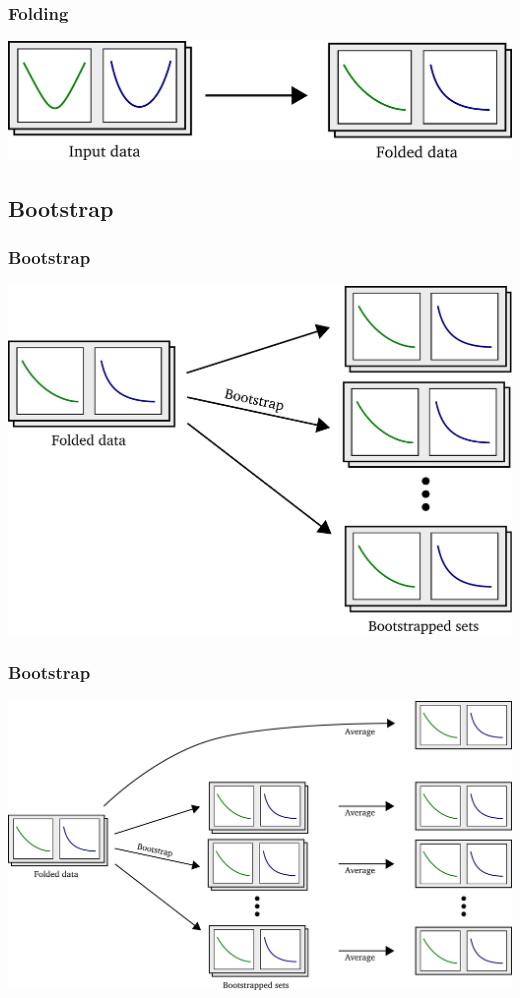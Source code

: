 \documentclass[english, fleqn]{beamer}
\begin{document}
\begin{frame}
    \frametitle{Folding}
    \includegraphics[scale=\scale]{sketches/02-folding.pdf}
\end{frame}

\subsection{Bootstrap}

\begin{frame}
    \frametitle{Bootstrap}
    \includegraphics[scale=\scale]{sketches/03-bootstrap.pdf}
\end{frame}

\begin{frame}
    \frametitle{Bootstrap}
    \includegraphics[scale=\scale]{sketches/04-bootstrap.pdf}
\end{frame}
\end{document}
